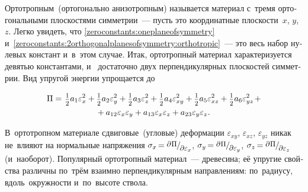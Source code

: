 \begin{otherlanguage}{russian}
Ортотропным~(ортогонально анизотропным) называется материал с~тремя ортогональными плоскостями симметрии~--- пусть это координатные плоскости~$x$, $y$, $z$. Легко увидеть, что \eqref{zeroconstants:oneplaneofsymmetry} и~\eqref{zeroconstants:2orthogonalplanesofsymmetry:orthotropic}~--- это весь набор нулевых констант и~в~этом случае. Итак, ортотропный материал характеризуется девятью константами, и~ достаточно двух перпендикулярных плоскостей симметрии. Вид упругой энергии упрощается до

\nopagebreak\vspace{-0.25em}\begin{multline*}
\Pi =^{\mathstrut^{\mathstrut}} \smalldisplaystyleonehalf a_1 \varepsilon^2_{x} + \smalldisplaystyleonehalf a_2 \varepsilon^2_{y} + \smalldisplaystyleonehalf a_3 \varepsilon^2_{z} + \smalldisplaystyleonehalf a_4 \varepsilon^2_{xy} + \smalldisplaystyleonehalf a_5 \varepsilon^2_{xz} + \smalldisplaystyleonehalf a_6 \varepsilon^2_{yz} \hspace{0.25ex} + \\[-0.1em]
%
+ \hspace{0.5ex} a_{12} \varepsilon_{x} \varepsilon_{y} + a_{13} \varepsilon_{x} \varepsilon_{z} + a_{23} \varepsilon_{y} \varepsilon_{z} \hspace{0.1ex} .
\end{multline*}

В~ортотропном материале сдвиговые~(угловые) деформации $\varepsilon_{xy}$, $\varepsilon_{xz}$, $\varepsilon_{yz}$ никак не~влияют на нормальные напряжения ${\sigma_x \hspace{-0.25ex} = \raisemath{0.16em}{\scalebox{0.88}{$\partial \hspace{0.1ex} \Pi$}} \hspace{-0.1ex} / \hspace{-0.2ex} \raisemath{-0.32em}{\scalebox{0.88}{$\partial \varepsilon_x$}}}$, ${\sigma_y \hspace{-0.25ex} = \raisemath{0.16em}{\scalebox{0.88}{$\partial \hspace{0.1ex} \Pi$}} \hspace{-0.1ex} / \hspace{-0.2ex} \raisemath{-0.32em}{\scalebox{0.88}{$\partial \varepsilon_y$}}}$, ${\sigma_z \hspace{-0.25ex} = \raisemath{0.16em}{\scalebox{0.88}{$\partial \hspace{0.1ex} \Pi$}} \hspace{-0.1ex} / \hspace{-0.2ex} \raisemath{-0.32em}{\scalebox{0.88}{$\partial \varepsilon_z$}}}$ (и~наоборот). Популярный ортотропный материал~--- древесина; её упругие свойства различны по~трём взаимно перпендикулярным направлениям: по~радиусу, вдоль~окружности и~по~высоте ствола.


\end{otherlanguage}
